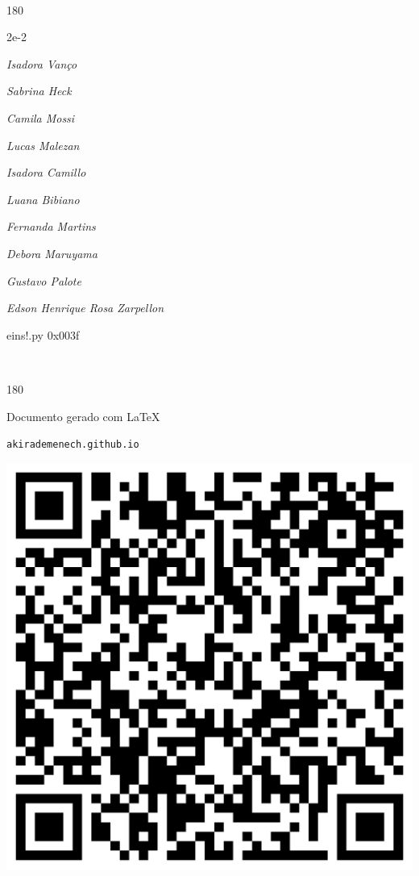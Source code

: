 \documentclass[12pt]{article}
\begin{document}
	\ 
	\vfill
	\begin{turn}{180}	
		\begin{minipage}{\textwidth}
		  	\ttfamily %
			\centering
			{\Huge 2e-2}
		  
			\hfill
		  
			

\textit{\small Isadora Vanço}

\textit{\small Sabrina Heck}

\textit{\small Camila Mossi}

\textit{\small Lucas Malezan}

\textit{\small Isadora Camillo}

\textit{\small Luana Bibiano}

\textit{\small Fernanda Martins}

\textit{\small Debora Maruyama}

\textit{\small Gustavo Palote}

\textit{\small Edson Henrique Rosa Zarpellon}

\bigskip

eins!.py
0x003f


		\end{minipage}	
	\end{turn}
	\vfill
	\

\pagebreak

	\begin{turn}{180}	
		\begin{minipage}{\textwidth}		  
		  Documento gerado com \LaTeX			
		  
		  \texttt{akirademenech.github.io}

		  \includegraphics[height=0.3\textheight]{2e-2.pdf}

		\end{minipage}	
	\end{turn}  
		  
\end{document}
